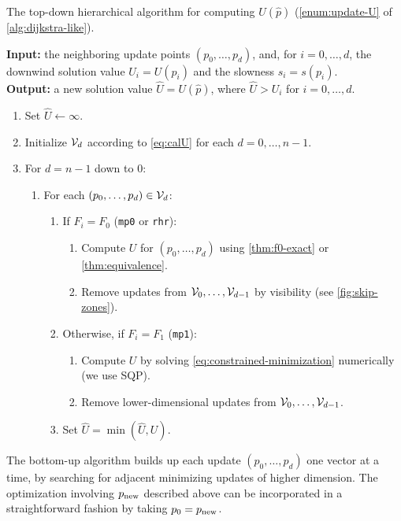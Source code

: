 \documentclass[eikonal.tex]{subfiles}
\begin{document}
\begin{algorithm}[H]
  \caption{The top-down hierarchical algorithm for computing
    $U(\hat{p})$ (\cref{enum:update-U} of
    \cref{alg:dijkstra-like}).}\label{alg:top-down}
  \textbf{Input:} the neighboring update points $(p_0, \hdots, p_d)$,
  and, for $i = 0, \hdots, d$, the downwind solution value
  $U_i = U(p_i)$ and the slowness $s_i = s(p_i)$. \\
  \textbf{Output:} a new solution value $\hat{U} = U(\hat{p})$, where
  $\hat{U} > U_i$ for $i = 0, \hdots, d$.
  \begin{enumerate}[nolistsep]
  \item Set $\hat{U} \gets \infty$.
  \item Initialize $\mathcal{V}_d$ according to \cref{eq:calU} for each
    $d = 0, \hdots, n - 1$.
  \item For $d = n - 1$ down to $0$:
    \begin{enumerate}
    \item For each $(p_0, \hdots, p_d) \in \mathcal{V}_d$:
      \begin{enumerate}
      \item If $F_i = F_0$ (\texttt{mp0} or \texttt{rhr}):
        \begin{enumerate}
        \item Compute $U$ for $(p_0, \hdots, p_{d})$ using
          \cref{thm:f0-exact} or \cref{thm:equivalence}.
        \item Remove updates from $\mathcal{V}_0, \hdots, \mathcal{V}_{d-1}$ by
          visibility (see \cref{fig:skip-zones}).
        \end{enumerate}
      \item Otherwise, if $F_i = F_1$ (\texttt{mp1}):
        \begin{enumerate}
        \item Compute $U$ by solving
          \cref{eq:constrained-minimization} numerically (we use SQP).
        \item Remove lower-dimensional updates from
          $\mathcal{V}_0, \hdots, \mathcal{V}_{d-1}$.
        \end{enumerate}
      \item Set $\hat{U} = \min(\hat{U}, U)$.
      \end{enumerate}
    \end{enumerate}
  \end{enumerate}
\end{algorithm}

The bottom-up algorithm builds up each update $(p_0, \hdots, p_d)$ one
vector at a time, by searching for adjacent minimizing updates of
higher dimension. The optimization involving $p_{\operatorname{new}}$ described above
can be incorporated in a straightforward fashion by taking
$p_0 = p_{\operatorname{new}}$.
\end{document}
